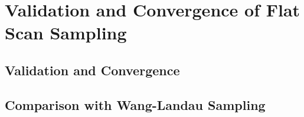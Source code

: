 \chapter{Validation and Convergence of Flat Scan Sampling}

\section{Validation and Convergence}

\section{Comparison with Wang-Landau Sampling}

